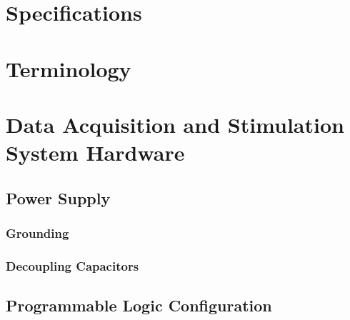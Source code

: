 \documentclass{article}
\begin{document}
\section[Specifications]{Specifications\footnotemark}\label{sec:spec}



\section{Terminology}\label{sec:term}



\section{Data Acquisition and Stimulation System Hardware}\label{sec:hardware}



\subsection{Power Supply}\label{sec:power}



\subsubsection{Grounding}\label{sec:ground}



\subsubsection{Decoupling Capacitors}


	
\subsection{Programmable Logic Configuration}
\end{document}

